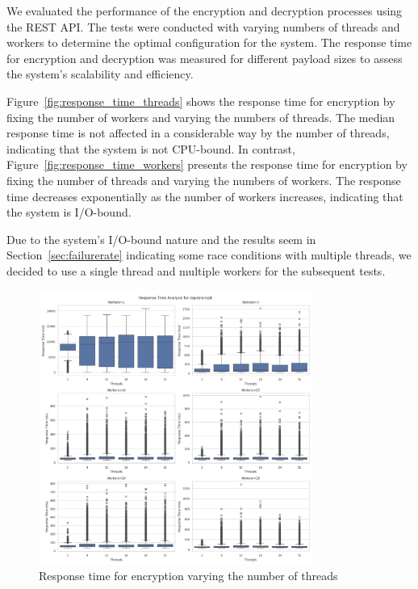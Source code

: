\documentclass[cic,tc,english]{iiufrgs}
\begin{document}
            We evaluated the performance of the encryption and decryption processes using the REST API. The tests were conducted with varying numbers of threads and workers to determine the optimal configuration for the system. The response time for encryption and decryption was measured for different payload sizes to assess the system's scalability and efficiency.

            

            Figure~\ref{fig:response_time_threads} shows the response time for encryption by fixing the number of workers and varying the numbers of threads. The median response time is not affected in a considerable way by the number of threads, indicating that the system is not CPU-bound. In contrast, Figure~\ref{fig:response_time_workers} presents the response time for encryption by fixing the number of threads and varying the numbers of workers. The response time decreases exponentially as the number of workers increases, indicating that the system is I/O-bound.

            Due to the system's I/O-bound nature and the results seem in Section~\ref{sec:failurerate} indicating some race conditions with multiple threads, we decided to use a single thread and multiple workers for the subsequent tests.

            \begin{figure}
                \centering
                \includegraphics[width=0.8\textwidth]{images/phase1/api_encrypt/response_time_workers_summary.png}
                \caption{Response time for encryption varying the number of threads}
                \label{fig:encrypt_response_time_workers}
            \end{figure}
\end{document}
